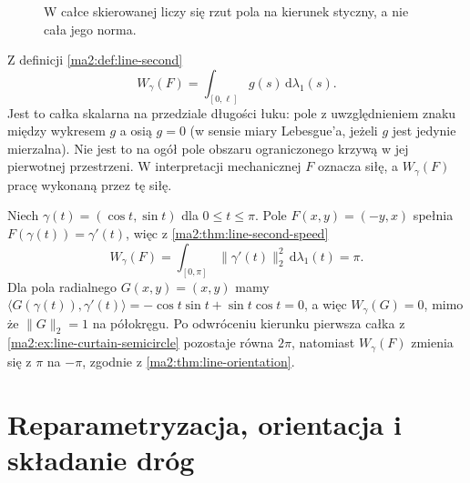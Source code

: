 \begin{figure}[htbp]
\centering
{}
\caption{W całce skierowanej liczy się rzut pola
na kierunek styczny, a nie cała jego norma.}
\label{ma2:fig:line-tangent-projection}
\end{figure}

Z definicji \ref{ma2:def:line-second}
\[
 W_\gamma(F)=\int_{[0,\ell]}g(s)\,\mathrm d\lambda_1(s).
\]
Jest to całka skalarna na przedziale długości
łuku: pole z uwzględnieniem znaku między wykresem
$g$ a osią $g=0$ (w sensie miary Lebesgue'a,
jeżeli $g$ jest jedynie mierzalna).
Nie jest to na ogół pole obszaru ograniczonego
krzywą w jej pierwotnej przestrzeni.
W interpretacji mechanicznej $F$ oznacza siłę,
a $W_\gamma(F)$ pracę wykonaną przez tę siłę.

\begin{przyklad}
\label{ma2:ex:line-tangent-semicircle}
Niech $\gamma(t)=(\cos t,\sin t)$ dla
$0\le t\le\pi$. Pole $F(x,y)=(-y,x)$
spełnia $F(\gamma(t))=\gamma'(t)$, więc
z \ref{ma2:thm:line-second-speed}
\[
 W_\gamma(F)=\int_{[0,\pi]}\|\gamma'(t)\|_2^2\,
                 \mathrm d\lambda_1(t)=\pi.
\]
Dla pola radialnego $G(x,y)=(x,y)$ mamy
$\langle G(\gamma(t)),\gamma'(t)\rangle
=-\cos t\sin t+\sin t\cos t=0$,
a więc $W_\gamma(G)=0$, mimo że $\|G\|_2=1$
na półokręgu.
Po odwróceniu kierunku pierwsza całka z
\ref{ma2:ex:line-curtain-semicircle}
pozostaje równa $2\pi$, natomiast
$W_\gamma(F)$ zmienia się z $\pi$ na $-\pi$,
zgodnie z \ref{ma2:thm:line-orientation}.
\end{przyklad}

\section{Reparametryzacja, orientacja i składanie dróg}

